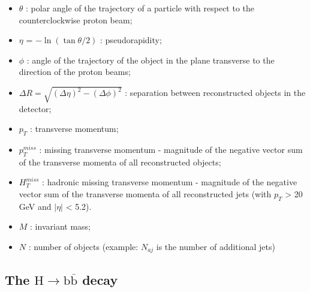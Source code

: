 \documentclass[EPJ,twocolumn]{webofc}
\begin{document}
\begin{itemize}
    \item   $\theta$ : polar angle of the trajectory of a particle with respect to the counterclockwise proton beam;
    \item     $\eta$ = $-\ln(\tan \theta/2)$ : pseudorapidity;
    \item     $\phi$ : angle of the trajectory of the object in the plane transverse to the direction of the proton beams;
    \item  $\Delta R =  \sqrt{(\Delta \eta)^2 - (\Delta \phi)^2}$ : separation between reconstructed objects in the detector;
    \item $p_T$ : transverse momentum;
    \item $p_T^{miss}$ : missing transverse momentum - magnitude of the negative vector sum of the transverse momenta of all reconstructed objects;
    \item $H_T^{miss}$ : hadronic missing transverse momentum - magnitude of the negative vector sum of the transverse momenta of all reconstructed jets (with $p_T$ > 20 GeV and $|\eta|$ < 5.2).
    \item $M$ : invariant mass;
    \item $N$ : number of objects (example: $N_{aj}$ is the number of additional jets)
\end{itemize}


\subsection{The $\text{H} \rightarrow \text{b}\overline{\text{b}}$ decay}
\end{document}
